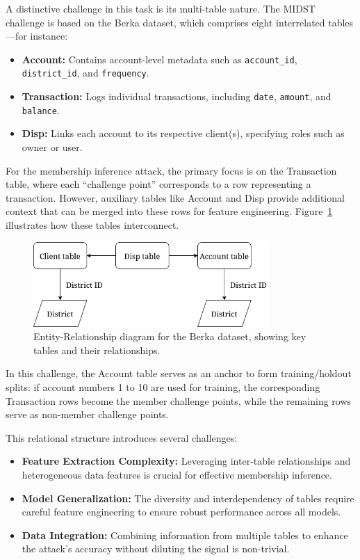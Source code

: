 \documentclass[12pt]{article}
\begin{document}
A distinctive challenge in this task is its multi-table nature. The MIDST challenge is based on the Berka dataset, which comprises eight interrelated tables—for instance:
\begin{itemize}
    \item \textbf{Account:} Contains account-level metadata such as \texttt{account\_id}, \texttt{district\_id}, and \texttt{frequency}.
    \item \textbf{Transaction:} Logs individual transactions, including \texttt{date}, \texttt{amount}, and \texttt{balance}.
    \item \textbf{Disp:} Links each account to its respective client(s), specifying roles such as owner or user.
\end{itemize}
For the membership inference attack, the primary focus is on the Transaction table, where each “challenge point” corresponds to a row representing a transaction. However, auxiliary tables like Account and Disp provide additional context that can be merged into these rows for feature engineering. Figure~\ref{fig:berka-erd} illustrates how these tables interconnect.

\begin{figure}[h!]
    \centering
    \includegraphics[width=0.8\textwidth]{berka_er_diagram.png}
    \caption{Entity-Relationship diagram for the Berka dataset, showing key tables and their relationships.}
    \label{fig:berka-erd}
\end{figure}

In this challenge, the Account table serves as an anchor to form training/holdout splits: if account numbers 1 to 10 are used for training, the corresponding Transaction rows become the member challenge points, while the remaining rows serve as non-member challenge points.

This relational structure introduces several challenges:
\begin{itemize}
    \item \textbf{Feature Extraction Complexity:} 
    Leveraging inter-table relationships and heterogeneous data features is crucial for effective membership inference.
    \item \textbf{Model Generalization:} 
    The diversity and interdependency of tables require careful feature engineering to ensure robust performance across all models.
    \item \textbf{Data Integration:} 
    Combining information from multiple tables to enhance the attack’s accuracy without diluting the signal is non-trivial.
\end{itemize}
\end{document}
